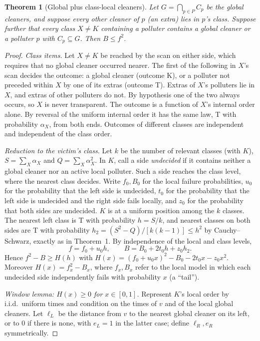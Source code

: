 \documentclass[11pt,a4paper]{article}
\newtheorem{theorem}{Theorem}[section]
\theoremstyle{definition}\newtheorem{definition}[theorem]{Definition}
\theoremstyle{remark}\newtheorem{remark}[theorem]{Remark}
\theoremstyle{definition}\newtheorem{xexample}[xtheorem]{Example}\theoremstyle{plain}
\begin{document}
\begin{theorem}[Global plus class-local cleaners]\label{thm:globallocal}
Let $G=\bigcap_{p\in P}C_p$ be the global cleaners, and suppose every other cleaner of $p$ (an \emph{extra}) lies in $p$'s class. Suppose further that every class $X\ne K$ containing a polluter contains a global cleaner or a polluter $p$ with $C_p\subseteq G$. Then $B\le f^2$.
\end{theorem}
\begin{proof}
\emph{Class items.} Let $X\ne K$ be reached by the scan on either side, which requires that no global cleaner occurred nearer. The first of the following in $X$'s scan decides the outcome: a global cleaner (outcome K), or a polluter not preceded within $X$ by one of its extras (outcome T). Extras of $X$'s polluters lie in $X$, and extras of other polluters do not. By hypothesis one of the two always occurs, so $X$ is never transparent. The outcome is a function of $X$'s internal order alone. By reversal of the uniform internal order it has the same law, T with probability $\alpha_X$, from both ends. Outcomes of different classes are independent and independent of the class order.

\emph{Reduction to the victim's class.} Let $k$ be the number of relevant classes (with $K$), $S=\sum_X\alpha_X$ and $Q=\sum_X\alpha_X^2$. In $K$, call a side \emph{undecided} if it contains neither a global cleaner nor an active local polluter. Such a side reaches the class level, where the nearest class decides. Write $f_0,B_0$ for the local failure probabilities, $u_0$ for the probability that the left side is undecided, $t_0$ for the probability that the left side is undecided and the right side fails locally, and $z_0$ for the probability that both sides are undecided. $K$ is at a uniform position among the $k$ classes. The nearest left class is T with probability $h=S/k$, and nearest classes on both sides are T with probability $h_2=(S^2-Q)/[k(k-1)]\le h^2$ by Cauchy--Schwarz, exactly as in Theorem~1. By independence of the local and class levels,
\[
f=f_0+u_0h,\qquad B=B_0+2t_0h+z_0h_2 .
\]
Hence $f^2-B\ge H(h)$ with $H(x)=(f_0+u_0x)^2-B_0-2t_0x-z_0x^2$. Moreover $H(x)=f_x^2-B_x$, where $f_x,B_x$ refer to the local model in which each undecided side independently fails with probability $x$ (a ``tail'').

\emph{Window lemma: $H(x)\ge0$ for $x\in[0,1]$.} Represent $K$'s local order by i.i.d.\ uniform times and condition on the times of $v$ and of the local global cleaners. Let $\ell_L$ be the distance from $v$ to the nearest global cleaner on its left, or to $0$ if there is none, with $e_L=1$ in the latter case; define $\ell_R,e_R$ symmetrically.


\end{proof}
\end{document}
